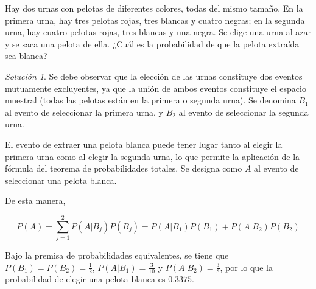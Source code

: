 \documentclass[
  us-letterpaper,
]{scrreprt}
\theoremstyle{plain}
\theoremstyle{definition}
\theoremstyle{definition}
\theoremstyle{plain}
\theoremstyle{remark}
\newtheorem*{solution}{Solución}
\begin{document}
\begin{tcolorbox}[enhanced jigsaw, bottomtitle=1mm, coltitle=black, breakable, leftrule=.75mm, left=2mm, rightrule=.15mm, titlerule=0mm, toprule=.15mm, toptitle=1mm, colback=white, colframe=quarto-callout-caution-color-frame, title={Ejemplo (\textbf{\emph{Seleccionar una pelota de varias urnas}})}, colbacktitle=quarto-callout-caution-color!10!white, arc=.35mm, bottomrule=.15mm, opacitybacktitle=0.6, opacityback=0]

Hay dos urnas con pelotas de diferentes colores, todas del mismo tamaño.
En la primera urna, hay tres pelotas rojas, tres blancas y cuatro
negras; en la segunda urna, hay cuatro pelotas rojas, tres blancas y una
negra. Se elige una urna al azar y se saca una pelota de ella. ¿Cuál es
la probabilidad de que la pelota extraída sea blanca?

\begin{solution}
Se debe observar que la elección de las urnas constituye dos eventos
mutuamente excluyentes, ya que la unión de ambos eventos constituye el
espacio muestral (todas las pelotas están en la primera o segunda urna).
Se denomina \(B_1\) al evento de seleccionar la primera urna, y \(B_2\)
al evento de seleccionar la segunda urna.

El evento de extraer una pelota blanca puede tener lugar tanto al elegir
la primera urna como al elegir la segunda urna, lo que permite la
aplicación de la fórmula del teorema de probabilidades totales. Se
designa como \(A\) al evento de seleccionar una pelota blanca.

De esta manera,

\[ P(A)= \sum_{j=1}^2 P(A|B_j)P(B_j)=P(A|B_1)P(B_1)+P(A|B_2)P(B_2) \]

Bajo la premisa de probabilidades equivalentes, se tiene que
\(P(B_1)=P(B_2)=\frac{1}{2}\), \(P(A|B_1)=\frac{3}{10}\) y
\(P(A|B_2)=\frac{3}{8}\), por lo que la probabilidad de elegir una
pelota blanca es \(0.3375\).
\end{solution}

\end{tcolorbox}
\end{document}
